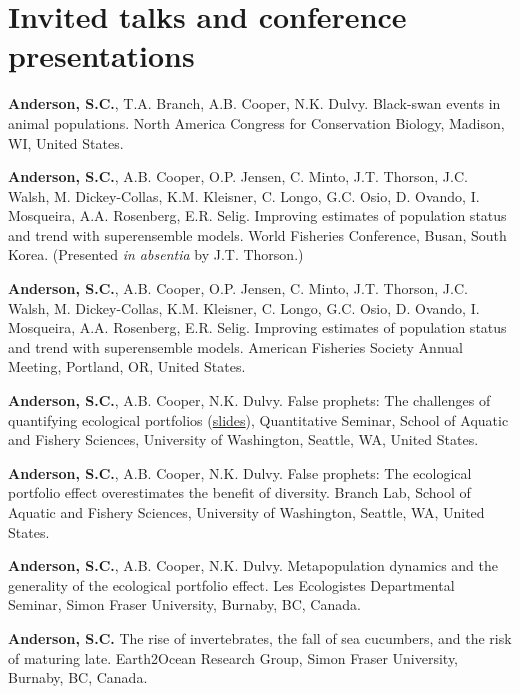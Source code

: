 \section{Invited talks and conference
presentations}\label{invited-talks-and-conference-presentations}

\begin{description}
\tightlist
\item[2016]
\textbf{Anderson, S.C.}, T.A. Branch, A.B. Cooper, N.K. Dulvy.
Black-swan events in animal populations. North America Congress for
Conservation Biology, Madison, WI, United States.
\item[2016]
\textbf{Anderson, S.C.}, A.B. Cooper, O.P. Jensen, C. Minto, J.T.
Thorson, J.C. Walsh, M. Dickey-Collas, K.M. Kleisner, C. Longo, G.C.
Osio, D. Ovando, I. Mosqueira, A.A. Rosenberg, E.R. Selig. Improving
estimates of population status and trend with superensemble models.
World Fisheries Conference, Busan, South Korea. (Presented \emph{in
absentia} by J.T. Thorson.)
\item[2015]
\textbf{Anderson, S.C.}, A.B. Cooper, O.P. Jensen, C. Minto, J.T.
Thorson, J.C. Walsh, M. Dickey-Collas, K.M. Kleisner, C. Longo, G.C.
Osio, D. Ovando, I. Mosqueira, A.A. Rosenberg, E.R. Selig. Improving
estimates of population status and trend with superensemble models.
American Fisheries Society Annual Meeting, Portland, OR, United States.
\item[2013]
\textbf{Anderson, S.C.}, A.B. Cooper, N.K. Dulvy. False prophets: The
challenges of quantifying ecological portfolios
(\href{http://seananderson.ca/talks/2013/PE_SAFS_quantsem.pdf}{slides}),
Quantitative Seminar, School of Aquatic and Fishery Sciences, University
of Washington, Seattle, WA, United States.
\item[2012]
\textbf{Anderson, S.C.}, A.B. Cooper, N.K. Dulvy. False prophets: The
ecological portfolio effect overestimates the benefit of diversity.
Branch Lab, School of Aquatic and Fishery Sciences, University of
Washington, Seattle, WA, United States.
\item[2012]
\textbf{Anderson, S.C.}, A.B. Cooper, N.K. Dulvy. Metapopulation
dynamics and the generality of the ecological portfolio effect. Les
Ecologistes Departmental Seminar, Simon Fraser University, Burnaby, BC,
Canada.
\item[2010]
\textbf{Anderson, S.C.} The rise of invertebrates, the fall of sea
cucumbers, and the risk of maturing late. Earth2Ocean Research Group,
Simon Fraser University, Burnaby, BC, Canada.
\item[2009]

\end{description}
